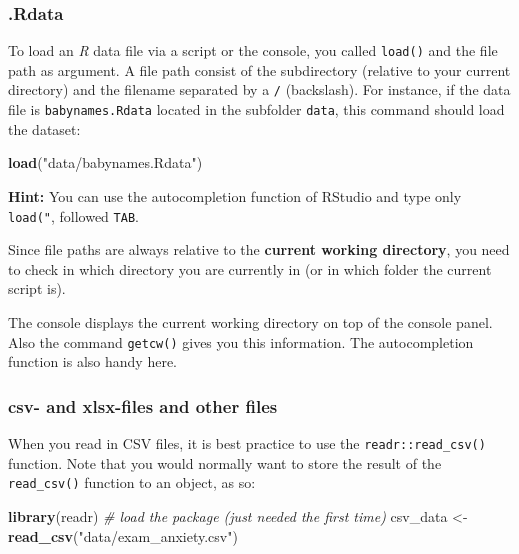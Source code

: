 \documentclass[
]{scrartcl}
\makeatletter
\newenvironment{Shaded}{\begin{snugshade}}{\end{snugshade}}
\newcommand{\CommentTok}[1]{\textcolor[rgb]{0.56,0.35,0.01}{\textit{#1}}}
\newcommand{\FunctionTok}[1]{\textcolor[rgb]{0.13,0.29,0.53}{\textbf{#1}}}
\newcommand{\NormalTok}[1]{#1}
\newcommand{\OtherTok}[1]{\textcolor[rgb]{0.56,0.35,0.01}{#1}}
\newcommand{\StringTok}[1]{\textcolor[rgb]{0.31,0.60,0.02}{#1}}
\newenvironment{kframe}{%
\medskip{}
\setlength{\fboxsep}{.8em}
 \def\at@end@of@kframe{}%
 \ifinner\ifhmode%
  \def\at@end@of@kframe{\end{minipage}}%
  \begin{minipage}{\columnwidth}%
 \fi\fi%
 \def\FrameCommand##1{\hskip\@totalleftmargin \hskip-\fboxsep
 \colorbox{shadecolor}{##1}\hskip-\fboxsep
     \hskip-\linewidth \hskip-\@totalleftmargin \hskip\columnwidth}%
 \MakeFramed {\advance\hsize-\width
   \@totalleftmargin\z@ \linewidth\hsize
   \@setminipage}}%
 {\par\unskip\endMakeFramed%
 \at@end@of@kframe}
\newenvironment{rmdblock}[1]
  {
  \begin{itemize}
  \renewcommand{\labelitemi}{
    \raisebox{-.7\height}[0pt][0pt]{
      {\setkeys{Gin}{width=3em,keepaspectratio}\texttt{[image: images/\#1]}}
    }
  }
  \setlength{\fboxsep}{1em}
  \begin{kframe}
  \item
  }
  {
  \end{kframe}
  \end{itemize}
  }
\newenvironment{important}
    {\begin{rmdblock}{hint}}
    {\end{rmdblock}}
\makeatother
\begin{document}
\hypertarget{rdata}{%
\subsubsection*{.Rdata}\label{rdata}}

To load an \emph{R} data file via a script or the console, you called \texttt{load()} and the file path as argument. A file path consist of the subdirectory (relative to your current directory) and the filename separated by a \texttt{/} (backslash). For instance, if the data file is \texttt{babynames.Rdata} located in the subfolder \texttt{data}, this command should load the dataset:

\begin{Shaded}
\begin{Highlighting}[]
\FunctionTok{load}\NormalTok{(}\StringTok{"data/babynames.Rdata"}\NormalTok{)}
\end{Highlighting}
\end{Shaded}

\textbf{Hint:} You can use the autocompletion function of RStudio and type only \texttt{load("}, followed \texttt{TAB}.

\begin{important}
Since file paths are always relative to the \textbf{current working
directory}, you need to check in which directory you are currently in
(or in which folder the current script is).

The console displays the current working directory on top of the console
panel. Also the command \texttt{getcw()} gives you this information. The
autocompletion function is also handy here.
\end{important}

\hypertarget{csv--and-xlsx-files-and-other-files}{%
\subsubsection*{csv- and xlsx-files and other files}\label{csv--and-xlsx-files-and-other-files}}

When you read in CSV files, it is best practice to use the \texttt{readr::read\_csv()} function. Note that you would normally want to store the result of the \texttt{read\_csv()} function to an object, as so:

\begin{Shaded}
\begin{Highlighting}[]
\FunctionTok{library}\NormalTok{(readr) }\CommentTok{\# load the package (just needed the first time)}
\NormalTok{csv\_data }\OtherTok{\textless{}{-}} \FunctionTok{read\_csv}\NormalTok{(}\StringTok{"data/exam\_anxiety.csv"}\NormalTok{)}
\end{Highlighting}
\end{Shaded}
\end{document}
